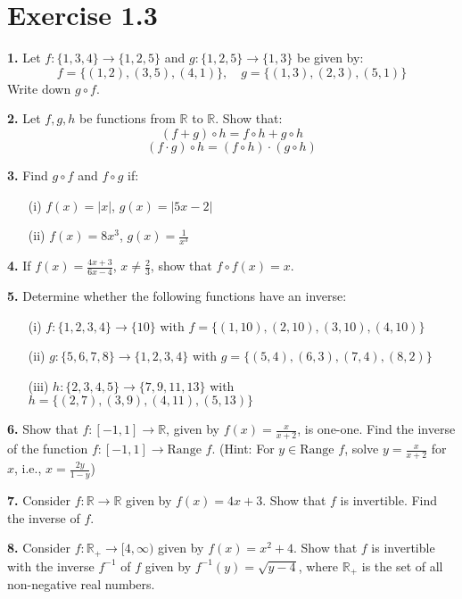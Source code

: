 \documentclass{article}
\begin{document}
\section*{Exercise 1.3}

\textbf{1.} Let $ f: \{1,3,4\} \to \{1,2,5\} $ and $ g: \{1,2,5\} \to \{1,3\} $ be given by:
\[
f = \{(1,2), (3,5), (4,1)\}, \quad g = \{(1,3), (2,3), (5,1)\}
\]
Write down $g \circ f$.

\textbf{2.} Let $ f, g, h $ be functions from $ \mathbb{R} $ to $ \mathbb{R} $. Show that:
\[
(f + g) \circ h = f \circ h + g \circ h
\]
\[
(f \cdot g) \circ h = (f \circ h) \cdot (g \circ h)
\]

\textbf{3.} Find $ g \circ f $ and $ f \circ g $ if:
\begin{itemize}
    \item[(i)] $ f(x) = |x| $, $ g(x) = |5x - 2| $
    \item[(ii)] $ f(x) = 8x^3 $, $ g(x) = \frac{1}{x^3} $
\end{itemize}

\textbf{4.} If $ f(x) = \frac{4x+3}{6x-4} $, $ x \neq \frac{2}{3} $, show that $ f \circ f (x) = x $.

\textbf{5.} Determine whether the following functions have an inverse:
\begin{itemize}
    \item[(i)] $ f: \{1,2,3,4\} \to \{10\} $ with $ f = \{(1,10), (2,10), (3,10), (4,10)\} $
    \item[(ii)] $ g: \{5,6,7,8\} \to \{1,2,3,4\} $ with $ g = \{(5,4), (6,3), (7,4), (8,2)\} $
    \item[(iii)] $ h: \{2,3,4,5\} \to \{7,9,11,13\} $ with $ h = \{(2,7), (3,9), (4,11), (5,13)\} $
\end{itemize}

\textbf{6.} Show that $ f: [-1,1] \to \mathbb{R} $, given by $ f(x) = \frac{x}{x+2} $, is one-one. Find the inverse of the function $ f: [-1,1] \to \text{Range } f $.
(Hint: For $ y \in \text{Range } f $, solve $ y = \frac{x}{x+2} $ for $ x $, i.e., $ x = \frac{2y}{1-y} $)

\textbf{7.} Consider $ f: \mathbb{R} \to \mathbb{R} $ given by $ f(x) = 4x + 3 $. Show that $ f $ is invertible. Find the inverse of $ f $.

\textbf{8.} Consider $ f: \mathbb{R}_+ \to [4, \infty) $ given by $ f(x) = x^2 + 4 $. Show that $ f $ is invertible with the inverse $ f^{-1} $ of $ f $ given by $ f^{-1}(y) = \sqrt{y-4} $, where $ \mathbb{R}_+ $ is the set of all non-negative real numbers.
\end{document}
